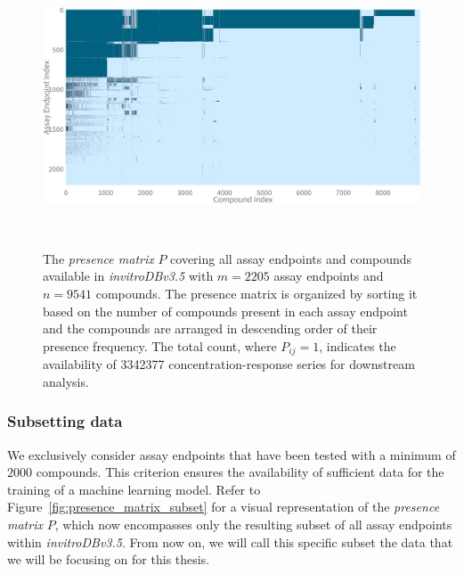 \begin{figure}[h]  %
    \centering
    \includegraphics[width=1.0\textwidth]{figures/presence_matrix_all.png}  
    \caption{The \emph{presence matrix} $P$ covering all assay endpoints and compounds available in \textit{invitroDBv3.5} with $m = \num{2205}$ assay endpoints and $n = \num{9541}$ compounds. The presence matrix is organized by sorting it based on the number of compounds present in each assay endpoint and the compounds are arranged in descending order of their presence frequency. The total count, where $P_{ij} = 1$, indicates the availability of \num{3342377} concentration-response series for downstream analysis.}
~\label{fig:presence_matrix_all} 
\end{figure}

\subsubsection{Subsetting data}
We exclusively consider assay endpoints that have been tested with a minimum of $\num{2000}$ compounds. This criterion ensures the availability of sufficient data for the training of a machine learning model. Refer to Figure~\ref{fig:presence_matrix_subset} for a visual representation of the \emph{presence matrix} $P$, which now encompasses only the resulting subset of all assay endpoints within \textit{invitroDBv3.5}. From now on, we will call this specific subset the data that we will be focusing on for this thesis. 


